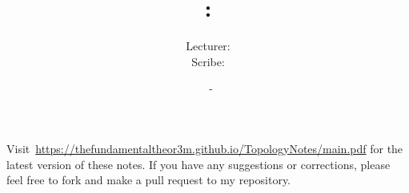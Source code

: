 \documentclass[a4paper, 12pt, openany, oneside]{book}
\title{\vspace{-2em}\COURSENUMBER: \COURSENAME}
\author{Lecturer: \LECTURER \\ Scribe: \SCRIBE}
\date{\UNIVERSITY\ - \TERM}
\begin{document}
\setlength{\abovedisplayskip}{7.5pt}  %
\setlength{\belowdisplayskip}{7.5pt}  %
\setlength{\abovedisplayshortskip}{2pt}
\setlength{\belowdisplayshortskip}{2pt}

\maketitle
\thispagestyle{empty}

\tableofcontents
\thispagestyle{empty}

\newpage

\nocite{*}




% 

\newpage




\printbibliography[prenote=mybibnote]
\thispagestyle{empty}

Visit~\url{https://thefundamentaltheor3m.github.io/TopologyNotes/main.pdf} for the latest version of these notes. If you have any suggestions or corrections, please feel free to fork and make a pull request to my repository.
\end{document}
